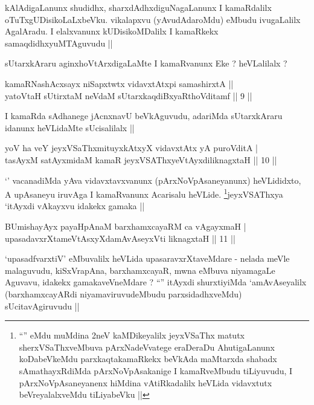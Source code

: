 \begin{artha}
kAlAdigaLanunx shudidhx, sharxdAdhxdiguNagaLanunx I kamaRdalilx oTuTxgUDisikoLaLxbeVku. vikalapxvu (yAvudAdaroMdu) eMbudu ivugaLalilx AgalAradu. I elalxvanunx kUDisikoMDalilx I kamaRkekx samaqdidhxyuMTAguvudu ||
\end{artha}

\begin{artha}
sUtarxkAraru aginxhoVtArxdigaLaMte I kamaRvanunx Eke ? heVLalilalx ?
\end{artha}

\begin{shl}
kamaRNashAcxsayx niSapxtwtx vidavxtAtx\s pi samashirxtA || \\
yatoV\s taH sUtirxtaM neVdaM sUtarxkaqdiBxyaRthoVditamf \hfill|| 9 || 
\end{shl}

\begin{artha}
I kamaRda sAdhanege jAcnxnavU beVkAguvudu, adariMda sUtarxkAraru idanunx heVLidaMte sUcisalilalx ||
\end{artha}

\begin{shl}
yoV ha veY jeyxVSaThxmituyxkAtxyX vidavxtAtx yA puroVditA | \\
tasAyxM satAyxmidaM kamaR jeyxVSAThxyeVtAyxdiliknagxtaH \hfill|| 10 || 
\end{shl}

\begin{artha}
`\stext' vacanadiMda yAva vidavxtavxvanunx (pArxNoVpAsaneyanunx) heVLididxto, A upAsaneyu iruvAga I kamaRvanunx Acarisalu heVLide. \footnote{``\stext'' eMdu muMdina 2neV kaMDikeyalilx jeyxVSaThx matutx sherxVSaThxveMbuva pArxNadeVvatege eraDeraDu AhutigaLanunx koDabeVkeMdu parxkaqtakamaRkekx beVkAda maMtarxda shabadx sAmathayxRdiMda pArxNoVpAsakanige I kamaRveMbudu tiLiyuvudu, I pArxNoVpAsaneyanenx hiMdina vAtiRkadalilx heVLida vidavxtutx beVreyalalxveMdu tiLiyabeVku ||}jeyxVSAThxya `itAyxdi vAkayxvu idakekx gamaka ||
\end{artha}

\begin{shl}
BUmishayAyx payaHpAnaM barxhamxcayaRM ca vAgayxmaH | \\
upasadavxrXtameVtAsxyXdamAvAseyxVti liknagxtaH \hfill|| 11 || 
\end{shl}

\begin{artha}
`upasadfvarxtiV' eMbuvalilx heVLida upasaravxrXtaveMdare - nelada meVle malaguvudu, kiSxVrapAna, barxhamxcayaR, mwna eMbuva niyamagaLe Aguvavu, idakekx gamakaveVneMdare ? ``\stext'' itAyxdi shurxtiyiMda `amAvAseyalilx (barxhamxcayARdi niyamaviruvudeMbudu parxsidadhxveMdu) sUcitavAgiruvudu ||
\end{artha}

